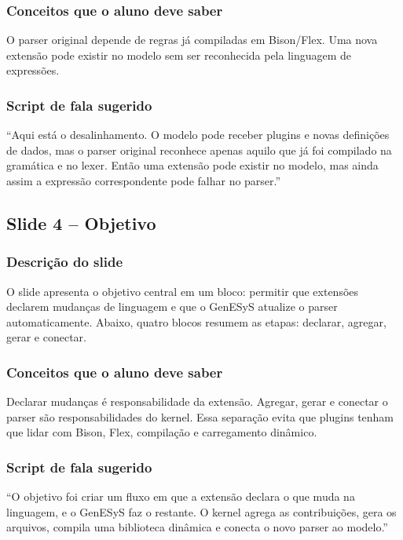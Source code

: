 \documentclass[12pt,a4paper]{article}
\newcommand{\slide}[2]{\subsection{Slide #1 -- #2}}
\begin{document}
\subsubsection*{Conceitos que o aluno deve saber}

O parser original depende de regras j\'a compiladas em Bison/Flex. Uma nova extens\~ao pode existir no modelo sem ser reconhecida pela linguagem de express\~oes.

\subsubsection*{Script de fala sugerido}

``Aqui est\'a o desalinhamento. O modelo pode receber plugins e novas defini\c{c}\~oes de dados, mas o parser original reconhece apenas aquilo que j\'a foi compilado na gram\'atica e no lexer. Ent\~ao uma extens\~ao pode existir no modelo, mas ainda assim a express\~ao correspondente pode falhar no parser.''

\slide{4}{Objetivo}

\subsubsection*{Descri\c{c}\~ao do slide}

O slide apresenta o objetivo central em um bloco: permitir que extens\~oes declarem mudan\c{c}as de linguagem e que o GenESyS atualize o parser automaticamente. Abaixo, quatro blocos resumem as etapas: declarar, agregar, gerar e conectar.

\subsubsection*{Conceitos que o aluno deve saber}

Declarar mudan\c{c}as \'e responsabilidade da extens\~ao. Agregar, gerar e conectar o parser s\~ao responsabilidades do kernel. Essa separa\c{c}\~ao evita que plugins tenham que lidar com Bison, Flex, compila\c{c}\~ao e carregamento din\^amico.

\subsubsection*{Script de fala sugerido}

``O objetivo foi criar um fluxo em que a extens\~ao declara o que muda na linguagem, e o GenESyS faz o restante. O kernel agrega as contribui\c{c}\~oes, gera os arquivos, compila uma biblioteca din\^amica e conecta o novo parser ao modelo.''
\end{document}
